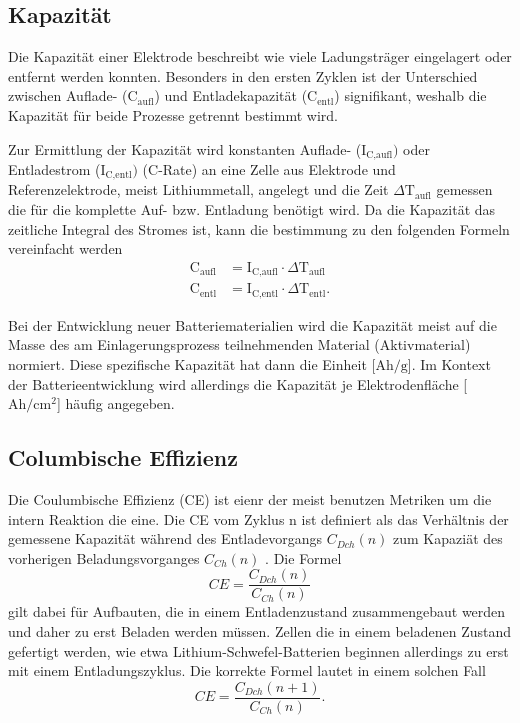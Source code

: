 \subsection{Kapazität}
Die Kapazität einer Elektrode beschreibt wie viele Ladungsträger eingelagert oder entfernt werden konnten. Besonders in den ersten Zyklen ist der Unterschied zwischen Auflade- ($\text{C}_{\text{aufl}}$) und Entladekapazität ($\text{C}_{\text{entl}}$) signifikant, weshalb die Kapazität für beide Prozesse getrennt bestimmt wird.

Zur Ermittlung der Kapazität wird konstanten Auflade- ($\text{I}_\text{C,aufl})$ oder Entladestrom ($\text{I}_\text{C,entl})$ (C-Rate) an eine Zelle aus Elektrode und Referenzelektrode, meist Lithiummetall, angelegt und die Zeit $\Delta \text{T}_\text{aufl}$ gemessen die für die komplette Auf- bzw. Entladung benötigt wird. Da die Kapazität das zeitliche Integral des Stromes ist, kann die bestimmung zu den folgenden Formeln vereinfacht werden
\begin{align}
	\text{C}_{\text{aufl}} &= \text{I}_\text{C,aufl} \cdot \Delta \text{T}_\text{aufl}\\
	\text{C}_{\text{entl}} &= \text{I}_\text{C,entl} \cdot \Delta \text{T}_\text{entl}.
\end{align}


Bei der Entwicklung neuer Batteriematerialien wird die Kapazität meist auf die Masse des am Einlagerungsprozess teilnehmenden Material (Aktivmaterial) normiert. Diese spezifische Kapazität hat dann die Einheit [$\si{\A \hour \per \g}$]. Im Kontext der Batterieentwicklung wird allerdings die Kapazität je Elektrodenfläche [$\si{\A \hour \per \cm \squared}$] häufig angegeben.


\subsection{Columbische Effizienz}
Die Coulumbische Effizienz (CE) ist eienr der meist benutzen Metriken um die intern Reaktion die eine. Die CE vom Zyklus n ist definiert als das Verhältnis der gemessene Kapazität während des Entladevorgangs $C_{Dch}(n)$ zum Kapaziät des vorherigen Beladungsvorganges $C_{Ch}(n)$ \cite{Tornheim2020}.
Die Formel
\begin{equation}
CE = \frac{C_{Dch}(n)}{C_{Ch}(n)}
\end{equation}
gilt dabei für Aufbauten, die in einem Entladenzustand zusammengebaut werden und daher zu erst Beladen werden müssen. Zellen die in einem beladenen Zustand gefertigt werden, wie etwa Lithium-Schwefel-Batterien beginnen allerdings zu erst mit einem Entladungszyklus. Die korrekte Formel lautet in einem solchen Fall
\begin{equation}
    CE = \frac{C_{Dch}(n+1)}{C_{Ch}(n)}.
\end{equation}

